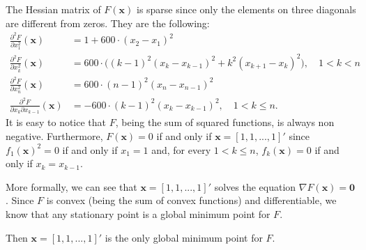 The Hessian matrix of $F(\boldsymbol{x})$ is sparse since only the elements on three diagonals are different from zeros. They are the following:
\begin{align*}
    \frac{\partial^2 F}{\partial x_1^2} (\boldsymbol{x}) &= 1+600\cdot(x_2-x_1)^2 \\
    \frac{\partial^2 F}{\partial x_k^2} (\boldsymbol{x}) &= 600\cdot\Big((k-1)^2(x_k-x_{k-1})^2+k^2(x_{k+1}-x_k)^2 \Big), \quad 1 < k < n  & \\
    \frac{\partial^2 F}{\partial x_n^2} (\boldsymbol{x}) &=600\cdot(n-1)^2(x_n-x_{n-1})^2 \\
    \frac{\partial^2 F}{\partial x_k \partial x_{k-1}} (\boldsymbol{x}) &= -600\cdot (k-1)^2(x_k-x_{k-1})^2, \quad 1<k\leq n.
\end{align*}
It is easy to notice that $F$, being the sum of squared functions, is always non negative. Furthermore, $F(\boldsymbol{x})=0$ if and only if $\boldsymbol{x}=[1,1,...,1]'$ since $f_1(\boldsymbol{x})^2=0$ if and only if $x_1=1$ and, for every $1<k\leq n$, $f_k(\boldsymbol{x})=0$ if and only if $x_k=x_{k-1}$.

More formally, we can see that $\boldsymbol{x}=[1,1,...,1]'$ solves the equation $\nabla F(\boldsymbol{x})=\boldsymbol{0}$. Since $F$ is convex (being the sum of convex functions) and differentiable, we know that any stationary point is a global minimum point for $F$. 

Then $\boldsymbol{x}=[1,1,...,1]'$ is the only global minimum point for $F$.

